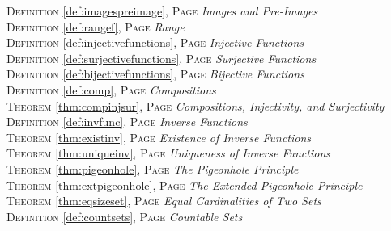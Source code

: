 \begin{multicols}{2}
{\textsc{Definition} \ref{def:imagespreimage}, \textsc{Page} \pageref{def:imagespreimage} \textit{Images and Pre-Images} \\
\textsc{Definition} \ref{def:rangef}, \textsc{Page} \pageref{def:rangef} \textit{Range} \\
\textsc{Definition} \ref{def:injectivefunctions}, \textsc{Page} \pageref{def:injectivefunctions} \textit{Injective Functions} \\
\textsc{Definition} \ref{def:surjectivefunctions}, \textsc{Page} \pageref{def:surjectivefunctions} \textit{Surjective Functions} \\
\textsc{Definition} \ref{def:bijectivefunctions}, \textsc{Page} \pageref{def:bijectivefunctions} \textit{Bijective Functions} \\
\textsc{Definition} \ref{def:comp}, \textsc{Page} \pageref{def:comp} \textit{Compositions} \\
\textsc{Theorem} \ref{thm:compinjsur}, \textsc{Page} \pageref{thm:compinjsur} \textit{Compositions, Injectivity, and Surjectivity} \\
\textsc{Definition} \ref{def:invfunc}, \textsc{Page} \pageref{def:invfunc} \textit{Inverse Functions} \\
\textsc{Theorem} \ref{thm:existinv}, \textsc{Page} \pageref{thm:existinv} \textit{Existence of Inverse Functions} \\
\textsc{Theorem} \ref{thm:uniqueinv}, \textsc{Page} \pageref{thm:uniqueinv} \textit{Uniqueness of Inverse Functions} \\
\textsc{Theorem} \ref{thm:pigeonhole}, \textsc{Page} \pageref{thm:pigeonhole} \textit{The Pigeonhole Principle} \\
\textsc{Theorem} \ref{thm:extpigeonhole}, \textsc{Page} \pageref{thm:extpigeonhole} \textit{The Extended Pigeonhole Principle} \\
\textsc{Theorem} \ref{thm:eqsizeset}, \textsc{Page} \pageref{thm:eqsizeset} \textit{Equal Cardinalities of Two Sets} \\
\textsc{Definition} \ref{def:countsets}, \textsc{Page} \pageref{def:countsets} \textit{Countable Sets} \\

      }
\end{multicols}

